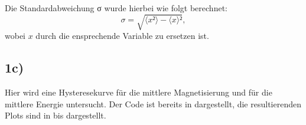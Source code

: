 Die Standardabweichung σ wurde hierbei wie folgt berechnet:
\begin{equation}
σ = \sqrt{\langle x²\rangle - \langle x \rangle²},
\end{equation}
wobei $x$ durch die ensprechende Variable zu ersetzen ist.

\subsection*{1c)}
Hier wird eine Hysteresekurve für die mittlere Magnetisierung und für die mittlere
Energie untersucht. Der Code ist bereits in  dargestellt, die resultierenden
Plots sind in  bis  dargestellt.

\begin{figure}
  \centering
    \\

\end{figure}
